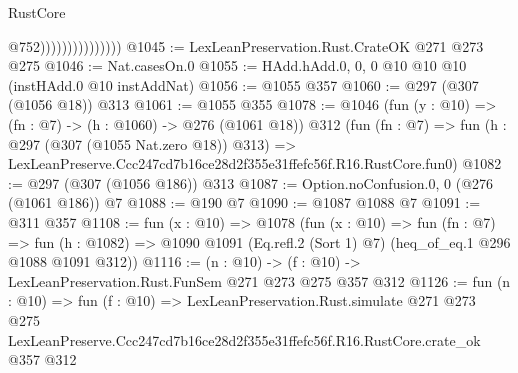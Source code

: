 \begin{lexlean}{RustCore}
\begin{coremodule}
                                  @752)))))))))))))))
@1045 := LexLeanPreservation.Rust.CrateOK @271 @273 @275
@1046 := Nat.casesOn.{0}
@1055 := HAdd.hAdd.{0, 0, 0} @10 @10 @10 (instHAdd.{0} @10 instAddNat)
@1056 := @1055 @357
@1060 := @297 (@307 (@1056 @18)) @313
@1061 := @1055 @355
@1078 := @1046
    (fun (y : @10) => (fn : @7) -> (h : @1060) -> @276 (@1061 @18))
    @312
    (fun (fn : @7) =>
    fun (h : @297 (@307 (@1055 Nat.zero @18)) @313) =>
    LexLeanPreserve.Ccc247cd7b16ce28d2f355e31ffefc56f.R16.RustCore.fun0)
@1082 := @297 (@307 (@1056 @186)) @313
@1087 := Option.noConfusion.{0, 0} (@276 (@1061 @186)) @7
@1088 := @190 @7
@1090 := @1087 @1088 @7
@1091 := @311 @357
@1108 := fun (x : @10) =>
  @1078
    (fun (x : @10) =>
    fun (fn : @7) =>
    fun (h : @1082) => @1090 @1091 (Eq.refl.{2} (Sort 1) @7) (heq_of_eq.{1} @296 @1088 @1091 @312))
@1116 := (n : @10) -> (f : @10) -> LexLeanPreservation.Rust.FunSem @271 @273 @275 @357 @312
@1126 := fun (n : @10) =>
  fun (f : @10) =>
  LexLeanPreservation.Rust.simulate
    @271
    @273
    @275
    LexLeanPreserve.Ccc247cd7b16ce28d2f355e31ffefc56f.R16.RustCore.crate_ok
    @357
    @312
\end{coremodule}
\end{lexlean}
